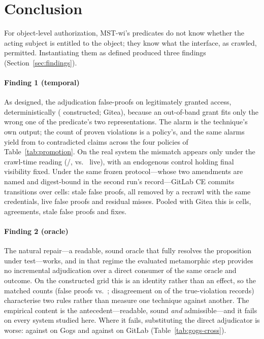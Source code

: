 \section{Conclusion}
\label{sec:conclusion}

For object-level authorization, \mbox{MST-wi}'s predicates do not know whether the acting
subject is entitled to the object; they know what the interface, as crawled, permitted.
Instantiating them as defined produced three findings (Section~\ref{sec:findings}).

\paragraph{Finding 1 (temporal)} As designed, the adjudication false-proofs on legitimately
granted access, deterministically (\ResObsOobVtwoFpRate{} constructed;
\ResRsMrBookkeepingFpRate{} Gitea), because an out-of-band grant fits only the wrong one of the
predicate's two representations. The alarm is the technique's own output; the count of proven
violations is a policy's, and the same \PolAlarms{} alarms yield from \PolPnoneFalse{} to
\PolPallFalse{} contradicted claims across the four policies of Table~\ref{tab:promotion}. On
the real system the mismatch appears only under the crawl-time reading
(\ResRsMismatchSnapshot{}/\ResRsMismatchDenom{}, vs.\ \ResRsMismatchLive{} live), with an
endogenous control holding final visibility fixed. Under the same frozen protocol---whose two
amendments are named and digest-bound in the second run's record---GitLab CE \GlVersion{}
commits \TmpGPolicyEvents{} transitions over \TmpGCells{} cells: \TmpGStaleFP{} stale false
proofs, all \TmpGFixed{} removed by a recrawl with the same credentials, \TmpGLiveFP{} live
false proofs and \TmpGStillMiss{} residual misses. Pooled with Gitea this is \TmpBothCells{}
cells, \TmpBothEeqY{} agreements, \TmpBothStaleFP{} stale false proofs and \TmpBothFixed{} fixes.

\paragraph{Finding 2 (oracle)} The natural repair---a readable, sound oracle that fully resolves
the proposition under test---works, and in that regime the evaluated metamorphic step provides no
incremental adjudication over a direct consumer of the same oracle and outcome. On the
constructed grid this is an identity rather than an effect, so the matched counts (false proofs
\ResAbDirectObserveFP{} vs.~\ResAbVThreeFP{}; disagreement on \ResAbDisagreementN{} of the
\ResAbNBola{} true-violation records) characterise two rules rather than measure one technique
against another. The empirical content is the antecedent---readable, sound \emph{and}
admissible---and it fails on every system studied here. Where it fails, substituting the direct
adjudicator is worse: \GgFpDirectObserve{} against \GgFpVthree{} on Gogs and \GlFpDirectObserve{}
against \GlFpVthree{} on GitLab (Table~\ref{tab:gogs-cross}).

